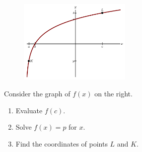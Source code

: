 \begin{enumerate}
\begin{minipage}{\linewidth}
\begin{figure}
    \centering
    \vspace{-100pt}
    \includegraphics[width=0.48\textwidth]{img/chap1/sec1-2/prob21.png}
\end{figure}
\item Consider the graph of $f(x)$ on the right.
    \begin{enumerate}
        \item Evaluate $f(c)$.
        \item Solve $f(x) = p$ for $x$.
        \item Find the coordinates of points $L$ and $K$.
    \end{enumerate}
\end{minipage}
\end{enumerate}
